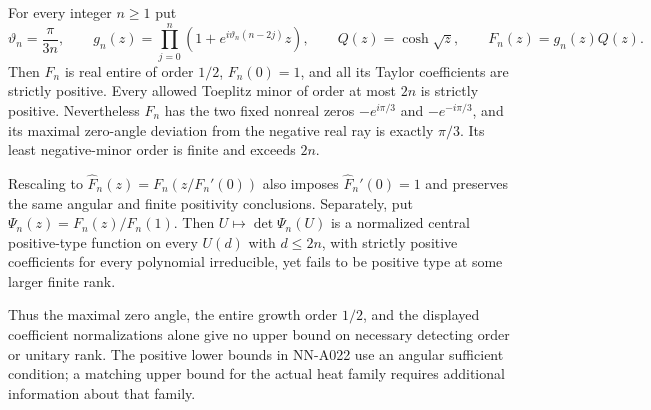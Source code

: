 \begin{theorem}
For every integer $n\ge1$ put
\[
 \vartheta_n=\frac{\pi}{3n},\qquad
 g_n(z)=\prod_{j=0}^{n}
                (1+e^{i\vartheta_n(n-2j)}z),\qquad
 Q(z)=\cosh\sqrt z,\qquad F_n(z)=g_n(z)Q(z).
\]
Then $F_n$ is real entire of order $1/2$, $F_n(0)=1$, and all
its Taylor coefficients are strictly positive. Every allowed
Toeplitz minor of order at most $2n$ is strictly positive.
Nevertheless $F_n$ has the two fixed nonreal zeros
$-e^{i\pi/3}$ and $-e^{-i\pi/3}$, and its maximal zero-angle
deviation from the negative real ray is exactly $\pi/3$.
Its least negative-minor order is finite and exceeds $2n$.

Rescaling to $\widehat F_n(z)=F_n(z/F_n'(0))$ also imposes
$\widehat F_n'(0)=1$ and preserves the same angular and finite
positivity conclusions. Separately, put
$\Psi_n(z)=F_n(z)/F_n(1)$. Then
$U\mapsto\det\Psi_n(U)$ is a normalized central positive-type
function on every $U(d)$ with $d\le2n$, with strictly positive
coefficients for every polynomial irreducible, yet fails to be
positive type at some larger finite rank.

Thus the maximal zero angle, the entire growth order $1/2$,
and the displayed coefficient normalizations alone give no
upper bound on necessary detecting order or unitary rank.
The positive lower bounds in NN-A022 use an angular sufficient
condition; a matching upper bound for the actual heat family
requires additional information about that family.
\end{theorem}

